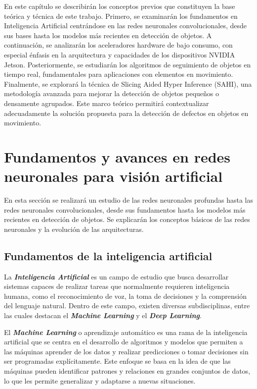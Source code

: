 \documentclass[11pt,spanish,listoffigures,listoftables]{tfgetsinf}
\begin{document}
En este capítulo se describirán los conceptos previos que constituyen la base teórica y técnica de este trabajo. Primero, se examinarán los fundamentos en Inteligencia Artificial centrándose en las redes neuronales convolucionales, desde sus bases hasta los modelos más recientes en detección de objetos. A continuación, se analizarán los aceleradores hardware de bajo consumo, con especial énfasis en la arquitectura y capacidades de los dispositivos NVIDIA Jetson. Posteriormente, se estudiarán los algoritmos de seguimiento de objetos en tiempo real, fundamentales para aplicaciones con elementos en movimiento. Finalmente, se explorará la técnica de Slicing Aided Hyper Inference (SAHI), una metodología avanzada para mejorar la detección de objetos pequeños o densamente agrupados. Este marco teórico permitirá contextualizar adecuadamente la solución propuesta para la detección de defectos en objetos en movimiento.

\section{Fundamentos y avances en redes neuronales para visión artificial} \label{sec:fundamentos_avances}
En esta sección se realizará un estudio de las redes neuronales profundas hasta las redes neuronales convolucionales, desde sus fundamentos hasta los modelos más recientes en detección de objetos. Se explicarán los conceptos básicos de las redes neuronales y la evolución de las arquitecturas.

\subsection{Fundamentos de la inteligencia artificial} \label{sec:fundamentos_inteligencia_artificial}
La \textit{\textbf{Inteligencia Artificial}} es un campo de estudio que busca desarrollar sistemas capaces de realizar tareas que normalmente requieren inteligencia humana, como el reconocimiento de voz, la toma de decisiones y la comprensión del lenguaje natural. Dentro de este campo, existen diversas 
subdisciplinas, entre las cuales destacan el \textit{\textbf{Machine Learning}} y el \textit{\textbf{Deep Learning}}.

El \textit{\textbf{Machine Learning}} o aprendizaje automático es una rama de la inteligencia artificial que se centra en el desarrollo de algoritmos y modelos que permiten a las máquinas aprender de los datos y realizar predicciones o tomar decisiones sin ser programadas explícitamente. Este enfoque se basa en la idea de que las máquinas pueden identificar patrones y relaciones en grandes conjuntos de datos, lo que les permite generalizar y adaptarse a nuevas situaciones.
\end{document}
